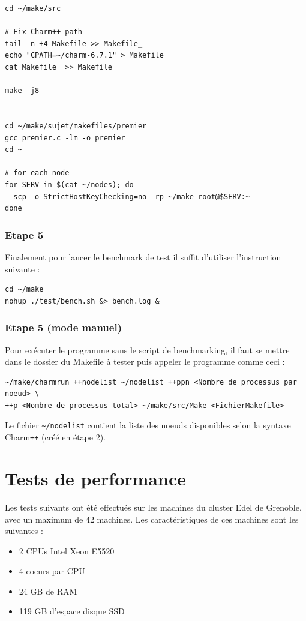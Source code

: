 \documentclass[a4paper, 11pt, titlepage]{article}
\begin{document}
\begin{verbatim}
cd ~/make/src

# Fix Charm++ path
tail -n +4 Makefile >> Makefile_
echo "CPATH=~/charm-6.7.1" > Makefile
cat Makefile_ >> Makefile

make -j8


cd ~/make/sujet/makefiles/premier
gcc premier.c -lm -o premier
cd ~

# for each node
for SERV in $(cat ~/nodes); do
  scp -o StrictHostKeyChecking=no -rp ~/make root@$SERV:~
done
\end{verbatim}


\subsubsection {Etape 5}

Finalement pour lancer le benchmark de test il suffit d'utiliser l'instruction suivante :

\begin{verbatim}
cd ~/make
nohup ./test/bench.sh &> bench.log &
\end{verbatim}


\subsubsection {Etape 5 (mode manuel)}

Pour exécuter le programme sans le script de benchmarking, il faut se mettre dans le dossier du Makefile à tester puis appeler le programme comme ceci :

\begin{verbatim}
~/make/charmrun ++nodelist ~/nodelist ++ppn <Nombre de processus par noeud> \
++p <Nombre de processus total> ~/make/src/Make <FichierMakefile>
\end{verbatim}

Le fichier \lstinline!~/nodelist! contient la liste des noeuds disponibles selon la syntaxe Charm\texttt{++} (créé en étape 2).


\newpage

\section {Tests de performance}

Les tests suivants ont été effectués sur les machines du cluster Edel de Grenoble, avec un maximum de 42 machines.
Les caractéristiques de ces machines sont les suivantes :

\begin{itemize}

\item
2 CPUs Intel Xeon E5520

\item
4 coeurs par CPU

\item
24 GB de RAM

\item
119 GB d'espace disque SSD

\end{itemize}
\end{document}
